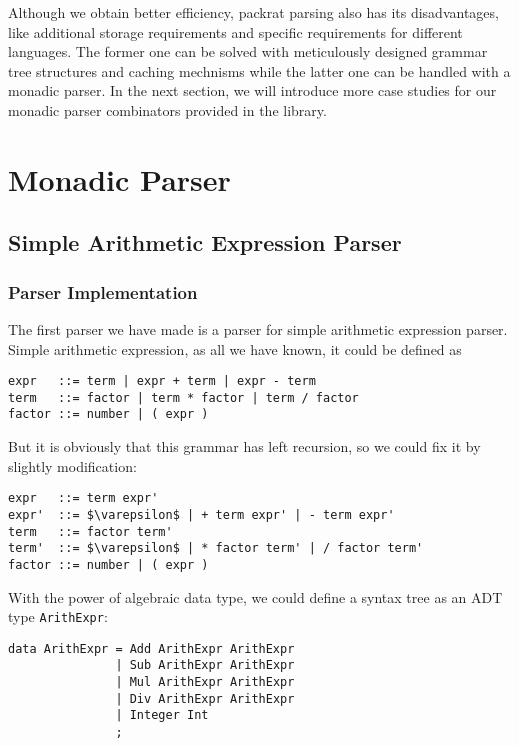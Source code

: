 Although we obtain better efficiency, packrat parsing also has its disadvantages, like additional storage requirements and specific requirements for different languages. The former one can be solved with meticulously designed grammar tree structures and caching mechnisms while the latter one can be handled with a monadic parser. In the next section, we will introduce more case studies for our monadic parser combinators provided in the library.

\section{Monadic Parser}

\subsection{Simple Arithmetic Expression Parser} \label{section:simple_arith_expr_parser}

\subsubsection{Parser Implementation}

The first parser we have made is a parser for simple arithmetic expression parser. Simple arithmetic expression, as all we have known, it could be defined as

\begin{lstlisting}[language={}]
expr   ::= term | expr + term | expr - term
term   ::= factor | term * factor | term / factor
factor ::= number | ( expr )
\end{lstlisting}

But it is obviously that this grammar has left recursion, so we could fix it by slightly modification:

\begin{lstlisting}[language={},mathescape]
expr   ::= term expr'
expr'  ::= $\varepsilon$ | + term expr' | - term expr'
term   ::= factor term'
term'  ::= $\varepsilon$ | * factor term' | / factor term'
factor ::= number | ( expr )
\end{lstlisting}

With the power of algebraic data type, we could define a syntax tree as an ADT type \texttt{ArithExpr}:

\begin{lstlisting}
data ArithExpr = Add ArithExpr ArithExpr
               | Sub ArithExpr ArithExpr
               | Mul ArithExpr ArithExpr
               | Div ArithExpr ArithExpr
               | Integer Int
               ;
\end{lstlisting}

